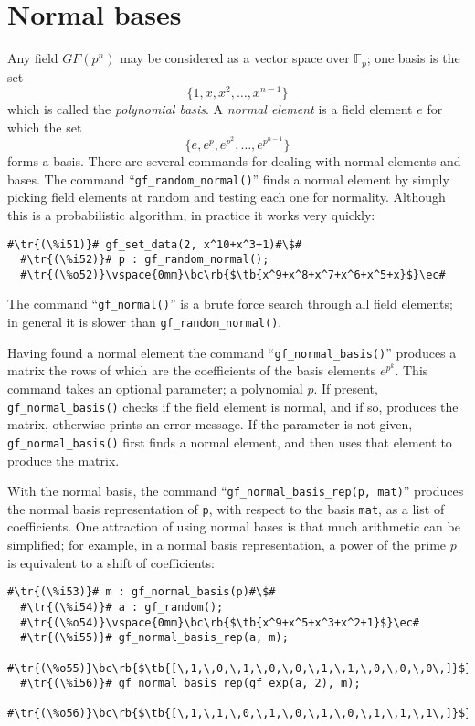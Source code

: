 \documentclass[a4paper,11pt,leqno,fleqn]{artikel3}
\newcommand{\bc}{\begin{center}}
\newcommand{\ec}{\end{center}}
\newcommand{\tr}[1]{\textcolor{red}{#1}}
\newcommand{\tb}[1]{\textcolor{blue}{#1}}
\newcommand{\rb}[1]{\raisebox{2mm}[0mm][1mm]{#1}}
\begin{document}
\vspace*{-3mm}
\section*{Normal bases}

Any field $GF(p^n)$ may be considered as a vector space over
$\mathbb{F}_p$; one basis is the set
\[
\{1,x,x^2,\ldots,x^{n-1}\}
\]
which is called the \emph{polynomial basis}.  A \emph{normal element} is a
field element $e$ for which the set
\[
\{e,e^p,e^{p^2},\ldots,e^{p^{n-1}}\}
\]
forms a basis.  There are several commands for dealing with normal elements
and bases.  The command ``\verb!gf_random_normal()!'' finds a normal element by
simply picking field elements at random and testing each one for normality.
Although this is a probabilistic algorithm, in practice it works very quickly:


\vspace*{2mm}
\begin{lstlisting}[escapechar=\#]
  #\tr{(\%i51)}# gf_set_data(2, x^10+x^3+1)#\$#
  #\tr{(\%i52)}# p : gf_random_normal();
  #\tr{(\%o52)}\vspace{0mm}\bc\rb{$\tb{x^9+x^8+x^7+x^6+x^5+x}$}\ec#
\end{lstlisting}

The command ``\verb!gf_normal()!'' is a brute force search through all
field elements; in general it is slower than \verb!gf_random_normal()!.

Having found a normal element the command ``\verb!gf_normal_basis()!'' produces a
matrix the rows of which are the coefficients of the basis elements
$e^{p^k}$.  This command takes an optional parameter; a polynomial $p$.  If
present, \verb!gf_normal_basis()! checks if the field element is normal, and if
so, produces the matrix, otherwise prints an error message.  If the parameter
is not given, \verb!gf_normal_basis()! first finds a normal element, and then
uses that element to produce the matrix.

With the normal basis, the command ``\verb!gf_normal_basis_rep(p, mat)!'' produces the
normal basis representation of \texttt{p}, with respect to the basis
\texttt{mat}, as a list of coefficients.  One attraction of using normal bases
is that much arithmetic can be simplified; for example, in a normal basis
representation, a power of the prime $p$ is equivalent to a shift of
coefficients:

\vspace*{2mm}
\begin{lstlisting}[escapechar=\#]
  #\tr{(\%i53)}# m : gf_normal_basis(p)#\$#
  #\tr{(\%i54)}# a : gf_random();
  #\tr{(\%o54)}\vspace{0mm}\bc\rb{$\tb{x^9+x^5+x^3+x^2+1}$}\ec#
  #\tr{(\%i55)}# gf_normal_basis_rep(a, m);
  #\tr{(\%o55)}\bc\rb{$\tb{[\,1,\,0,\,1,\,0,\,0,\,1,\,1,\,0,\,0,\,0\,]}$}\ec#
  #\tr{(\%i56)}# gf_normal_basis_rep(gf_exp(a, 2), m);
  #\tr{(\%o56)}\bc\rb{$\tb{[\,1,\,1,\,0,\,1,\,0,\,1,\,0,\,1,\,1,\,1\,]}$}\ec#
\end{lstlisting}
\end{document}
